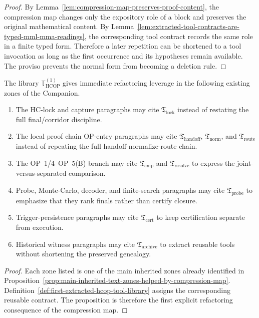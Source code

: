 \begin{proof}
By Lemma~\ref{lem:compression-map-preserves-proof-content}, the compression map changes only the expository role of a block and preserves the original mathematical content. By Lemma~\ref{lem:extracted-tool-contracts-are-typed-mml-mma-readings}, the corresponding tool contract records the same role in a finite typed form. Therefore a later repetition can be shortened to a tool invocation as long as the first occurrence and its hypotheses remain available. The proviso prevents the normal form from becoming a deletion rule.
\end{proof}

\begin{proposition}
\label{prop:where-first-tool-layer-helps-existing-text}
The library \(\mathbb T_{\mathrm{HCOP}}^{(1)}\) gives immediate refactoring leverage in the following existing zones of the Companion.
\begin{enumerate}[leftmargin=2em,label=(\roman*)]
 \item The HC-lock and capture paragraphs may cite \(\mathfrak T_{\mathrm{lock}}\) instead of restating the full final/corridor discipline.
 \item The local proof chain OP-entry paragraphs may cite \(\mathfrak T_{\mathrm{handoff}}\), \(\mathfrak T_{\mathrm{norm}}\), and \(\mathfrak T_{\mathrm{route}}\) instead of repeating the full handoff-normalize-route chain.
 \item The OP~1/4--OP~5(B) branch may cite \(\mathfrak T_{\mathrm{cmp}}\) and \(\mathfrak T_{\mathrm{resolve}}\) to express the joint-versus-separated comparison.
 \item Probe, Monte-Carlo, decoder, and finite-search paragraphs may cite \(\mathfrak T_{\mathrm{probe}}\) to emphasize that they rank finals rather than certify closure.
 \item Trigger-persistence paragraphs may cite \(\mathfrak T_{\mathrm{cert}}\) to keep certification separate from execution.
 \item Historical witness paragraphs may cite \(\mathfrak T_{\mathrm{archive}}\) to extract reusable tools without shortening the preserved genealogy.
\end{enumerate}
\end{proposition}

\begin{proof}
Each zone listed is one of the main inherited zones already identified in Proposition~\ref{prop:main-inherited-text-zones-helped-by-compression-map}. Definition~\ref{def:first-extracted-hcop-tool-library} assigns the corresponding reusable contract. The proposition is therefore the first explicit refactoring consequence of the compression map.
\end{proof}

